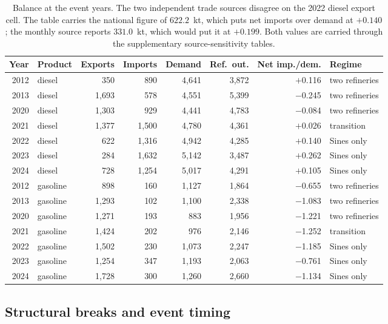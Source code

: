 \documentclass[11pt,a4paper]{article}
\begin{document}
\begin{table}[htbp]
\centering
\caption{Balance at the event years. The two independent trade sources disagree on the 2022
diesel export cell. The table carries the national figure of $622.2$~kt, which puts net imports
over demand at $+0.140$; the monthly source reports $331.0$~kt, which would put it at $+0.199$. Both values are carried through the supplementary
source-sensitivity tables.}
\label{tab:headline}
\small
\begin{tabular}{rlrrrrrl}
\toprule
Year & Product & Exports & Imports & Demand & Ref.\ out. & Net imp./dem. & Regime \\
\midrule
2012 & diesel & 350 & 890 & 4{,}641 & 3{,}872 & $+$0.116 & two refineries \\
2013 & diesel & 1{,}693 & 578 & 4{,}551 & 5{,}399 & $-$0.245 & two refineries \\
2020 & diesel & 1{,}303 & 929 & 4{,}441 & 4{,}783 & $-$0.084 & two refineries \\
2021 & diesel & 1{,}377 & 1{,}500 & 4{,}780 & 4{,}361 & $+$0.026 & transition \\
2022 & diesel & 622 & 1{,}316 & 4{,}942 & 4{,}285 & $+$0.140 & Sines only \\
2023 & diesel & 284 & 1{,}632 & 5{,}142 & 3{,}487 & $+$0.262 & Sines only \\
2024 & diesel & 728 & 1{,}254 & 5{,}017 & 4{,}291 & $+$0.105 & Sines only \\
\midrule
2012 & gasoline & 898 & 160 & 1{,}127 & 1{,}864 & $-$0.655 & two refineries \\
2013 & gasoline & 1{,}293 & 102 & 1{,}100 & 2{,}338 & $-$1.083 & two refineries \\
2020 & gasoline & 1{,}271 & 193 & 883 & 1{,}956 & $-$1.221 & two refineries \\
2021 & gasoline & 1{,}424 & 202 & 976 & 2{,}146 & $-$1.252 & transition \\
2022 & gasoline & 1{,}502 & 230 & 1{,}073 & 2{,}247 & $-$1.185 & Sines only \\
2023 & gasoline & 1{,}254 & 347 & 1{,}193 & 2{,}063 & $-$0.761 & Sines only \\
2024 & gasoline & 1{,}728 & 300 & 1{,}260 & 2{,}660 & $-$1.134 & Sines only \\
\bottomrule
\end{tabular}
\end{table}

\subsection{Structural breaks and event timing}
\end{document}
